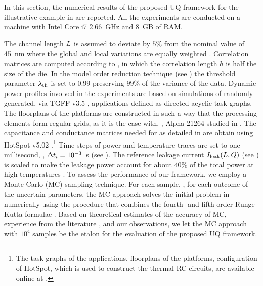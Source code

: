In this section, the numerical results of the proposed UQ framework for the illustrative example in  are reported. All the experiments are conducted on a machine with Intel Core i7 2.66~GHz and 8~GB of RAM.

The channel length $L$ is assumed to deviate by $5\%$ from the nominal value of 45~nm where the global and local variations are equally weighted \cite{juan2011, juan2012}.
Correlation matrices are computed according to , in which the correlation length $b$ is half the size of the die.
In the model order reduction technique (see ) the threshold parameter $\lambda_\text{th}$ is set to $0.99$ preserving $99\%$ of the variance of the data.
Dynamic power profiles involved in the experiments are based on simulations of randomly generated, via TGFF v3.5 \cite{dick1998}, applications defined as directed acyclic task graphs.
The floorplans of the platforms are constructed in such a way that the processing elements form regular grids, as it is the case with, \eg, Alpha 21264 studied in \cite{juan2011}.
The capacitance and conductance matrices needed for  as detailed in  are obtain using HotSpot v5.02 \cite{hotspot}.\footnote{The task graphs of the applications, floorplans of the platforms, configuration of HotSpot, which is used to construct the thermal RC circuits, are available online at \cite{sources}.}
Time steps of power and temperature traces are set to one millisecond, \ie, $\Delta t_i = 10^{-3}$~s (see ).
The reference leakage current $I_{\text{leak}}(L, Q)$ (see ) is scaled to make the leakage power account for about $40\%$ of the total power at high temperatures \cite{liu2007}.
To assess the performance of our framework, we employ a Monte Carlo (MC) sampling technique. For each sample, \ie, for each outcome of the uncertain parameters, the MC approach solves the initial problem in  numerically using the procedure that combines the fourth- and fifth-order Runge-Kutta formulae \cite{press2007}.
Based on theoretical estimates \cite{diaz-emparanza2002} of the accuracy of MC, experience from the literature \cite{xiu2010, eldred2009, maitre2010, shen2009}, and our observations, we let the MC approach with $10^4$ samples be the etalon for the evaluation of the proposed UQ framework.


